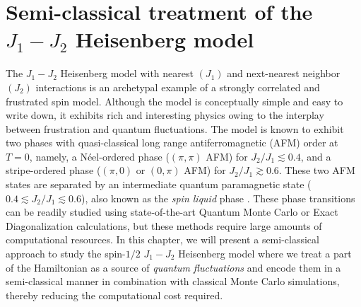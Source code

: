 \documentclass[../journal_main.tex]{subfiles}
\begin{document}
\chapter{Semi-classical treatment of the $J_1 - J_2$ Heisenberg model}
The $J_1 - J_2$ Heisenberg model with nearest $(J_1)$ and next-nearest neighbor $(J_2)$ interactions is an archetypal example of a strongly correlated and frustrated spin model. Although the model is conceptually simple and easy to write down, it exhibits rich and interesting physics owing to the interplay between frustration and quantum fluctuations. The model is known to exhibit two phases with quasi-classical long range antiferromagnetic (AFM) order at $T = 0$, namely, a Néel-ordered phase ($(\pi,\pi)$ AFM) for $J_2/J_1 \lesssim 0.4$, and a stripe-ordered phase ($(\pi, 0)$ or $(0, \pi)$ AFM) for $J_2/J_1 \gtrsim 0.6$. These two AFM states are separated by an intermediate quantum paramagnetic state ($0.4 \lesssim J_2/J_1 \lesssim 0.6$), also known as the \textit{spin liquid} phase \cite{Li_2014}. These phase transitions can be readily studied using state-of-the-art Quantum Monte Carlo or Exact Diagonalization calculations, but these methods require large amounts of computational resources. In this chapter, we will present a semi-classical approach to study the spin-$1/2$ $J_1-J_2$ Heisenberg model where we treat a part of the Hamiltonian as a source of \textit{quantum fluctuations} and encode them in a semi-classical manner in combination with classical Monte Carlo simulations, thereby reducing the computational cost required.
\end{document}
